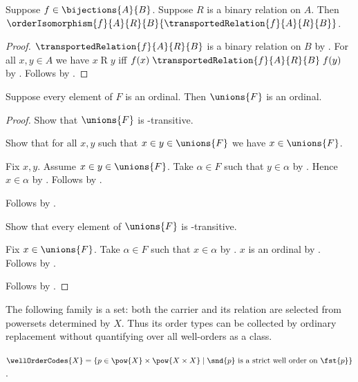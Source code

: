 \begin{theorem}\label{transported_relation_isomorphism}
    Suppose $f\in\bijections{A}{B}$.
    Suppose $R$ is a binary relation on $A$.
    Then
        $\orderIsomorphism{f}{A}{R}{B}
            {\transportedRelation{f}{A}{R}{B}}$.
\end{theorem}
\begin{proof}
    $\transportedRelation{f}{A}{R}{B}$ is a binary relation on $B$
        by .
    For all $x,y\in A$ we have $x\mathrel{R}y$ iff
        $f(x)\mathrel{\transportedRelation{f}{A}{R}{B}}f(y)$
        by .
    Follows by .
\end{proof}

\begin{proposition}\label{unions_of_family_of_ordinals_is_ordinal}
    Suppose every element of $F$ is an ordinal.
    Then $\unions{F}$ is an ordinal.
\end{proposition}
\begin{proof}
    Show that $\unions{F}$ is \in-transitive.
    \begin{subproof}
        Show that for all $x,y$ such that $x\in y\in\unions{F}$
            we have $x\in\unions{F}$.
        \begin{subproof}
            Fix $x,y$.
            Assume $x\in y\in\unions{F}$.
            Take $\alpha\in F$ such that $y\in\alpha$
                by .
            Hence $x\in\alpha$ by .
            Follows by .
        \end{subproof}
        Follows by .
    \end{subproof}
    Show that every element of $\unions{F}$ is \in-transitive.
    \begin{subproof}
        Fix $x\in\unions{F}$.
        Take $\alpha\in F$ such that $x\in\alpha$
            by .
        $x$ is an ordinal by .
        Follows by .
    \end{subproof}
    Follows by .
\end{proof}

The following family is a set: both the carrier and its relation are selected
from powersets determined by $X$.  Thus its order types can be collected by
ordinary replacement without quantifying over all well-orders as a class.

\begin{definition}\label{well_order_codes}
    $\wellOrderCodes{X}
        =\{p\in\pow{X}\times\pow{X\times X}\mid
            \text{$\snd{p}$ is a strict well order on $\fst{p}$}\}$.
\end{definition}

